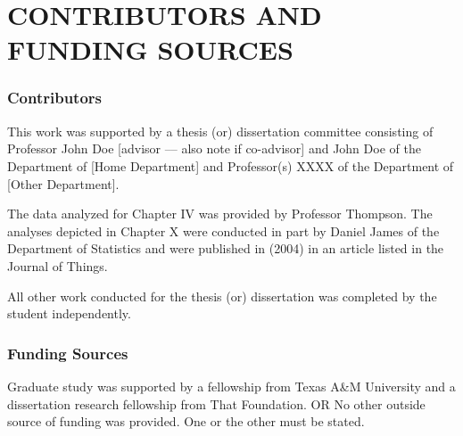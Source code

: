 %
%  
%

\chapter*{CONTRIBUTORS AND FUNDING SOURCES}

\subsection*{Contributors}
This work was supported by a thesis (or) dissertation committee consisting of Professor John Doe [advisor --– also note if co-advisor] and John Doe of the Department of [Home Department] and Professor(s) XXXX of the Department of [Other Department].

The data analyzed for Chapter IV was provided by Professor Thompson. The analyses depicted in Chapter X were conducted in part by Daniel James of the Department of Statistics and were published in (2004) in an article listed in the Journal of Things.

All other work conducted for the thesis (or) dissertation was completed by the student independently.
\subsection*{Funding Sources}
Graduate study was supported by a fellowship from Texas A\&M University and a dissertation research fellowship from That Foundation. OR No other outside source of funding was provided. One or the other must be stated.


\pagebreak{}
